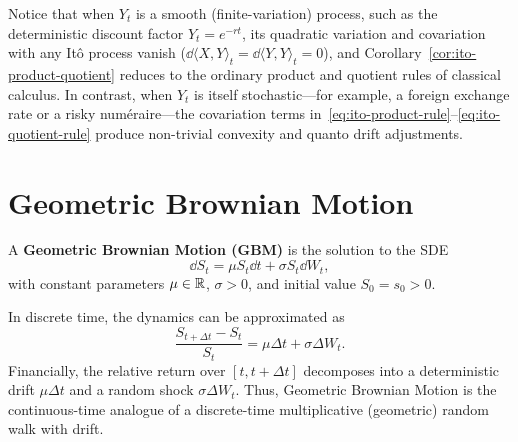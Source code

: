 Notice that when $Y_t$ is a smooth (finite-variation) process, such as the deterministic discount factor $Y_t = e^{-rt}$, its quadratic variation and covariation with any It\^o process vanish ($\dd\langle X, Y \rangle_t = \dd\langle Y, Y \rangle_t = 0$), and Corollary~\ref{cor:ito-product-quotient} reduces to the ordinary product and quotient rules of classical calculus. In contrast, when $Y_t$ is itself stochastic---for example, a foreign exchange rate or a risky num\'eraire---the covariation terms in~\eqref{eq:ito-product-rule}--\eqref{eq:ito-quotient-rule} produce non-trivial convexity and quanto drift adjustments.

\section{Geometric Brownian Motion}

\begin{definition}
\label{def:gbm}
A \textbf{Geometric Brownian Motion (GBM)} is the solution to the SDE
\[
\dd S_t = \mu S_t \dd t + \sigma S_t \dd W_t,
\]
with constant parameters $\mu \in \mathbb{R}$, $\sigma > 0$, and initial value $S_0 = s_0 > 0$.
\end{definition}

\begin{note}
In discrete time, the dynamics can be approximated as
\[
\frac{S_{t+\Delta t} - S_t}{S_t} = \mu \Delta t + \sigma \Delta W_t.
\]
Financially, the relative return over $[t, t+\Delta t]$ decomposes into a deterministic drift $\mu \Delta t$ and a random shock $\sigma \Delta W_t$. Thus, Geometric Brownian Motion is the continuous-time analogue of a discrete-time multiplicative (geometric) random walk with drift.
\end{note}

